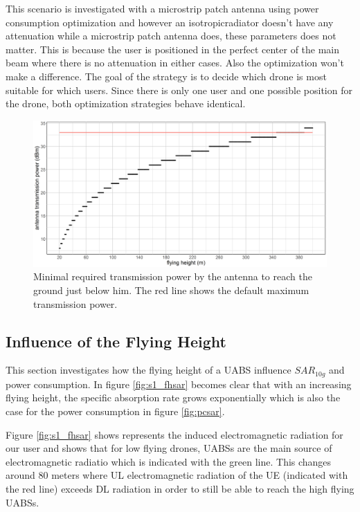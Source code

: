 This scenario is investigated with a microstrip patch antenna using power consumption optimization
and however an \gls{isotropicradiator} doesn't have any attenuation while a microstrip patch antenna does, these parameters does not matter.
This is because the user is positioned in the perfect center of the main beam where there is 
no attenuation in either cases. Also the optimization won't make a difference. The goal of the  strategy is to decide which drone is most suitable for which
users. Since there is only one user and one possible position for the drone, both optimization strategies behave identical.

\begin{figure}[h!]
  \includegraphics[width=\textwidth]{../results/s1/ptx.png}
  \caption{Minimal required transmission power by the antenna to reach the ground just below him. The red line shows the default maximum transmission power.}
  \label{fig:ptxfh}
\end{figure}

\subsection{Influence of the Flying Height}
\label{sub:senario1_influenceOfFlyHeight}

This section investigates how the flying height of a \gls{UABS} influence $SAR_{10g}$ and power consumption. In figure \ref{fig:s1_fhsar}
becomes clear that with an increasing flying height, the specific absorption rate grows exponentially 
which is also the case for the power consumption in figure \ref{fig:pcsar}.

Figure \ref{fig:s1_fhsar} shows represents the induced electromagnetic radiation for our user 
and shows that for low flying drones, \gls{UABS}s are the main source of electromagnetic radiatio which is indicated with the green line.
This changes around 80 meters where \gls{UL} electromagnetic radiation of the \gls{UE} (indicated with the red line)
exceeds \gls{DL} radiation in order to still be able to reach the high flying \gls{UABS}s.

